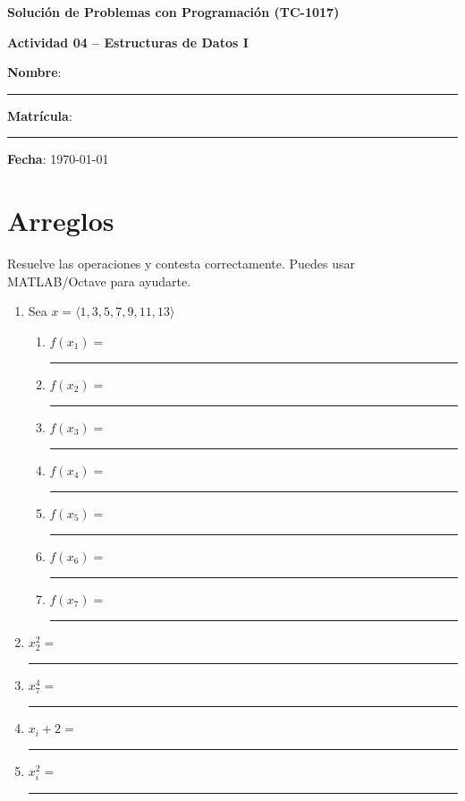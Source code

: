 \documentclass[spanish, 10pt]{article}
\newcommand{\shortresponserule}{{\large\rule{5 cm}{0.3mm}}}
\begin{document}
\begin{center}
	{\Large \textbf{Solución de Problemas con Programación (TC-1017)}}
	
	\bigskip
	{\large \textbf{Actividad 04 -- Estructuras de Datos I}}
\end{center}

\bigskip
{\large \textbf{Nombre}: \rule{13.7 cm}{0.4mm}}



\bigskip
{\large \textbf{Matrícula}: \rule{5 cm}{0.4mm}} \hfill {\large \textbf{Fecha}: \today}

\bigskip


\section{Arreglos}

Resuelve las operaciones y contesta correctamente. Puedes usar MATLAB/Octave para ayudarte.

\begin{enumerate}
    \itemsep2.5ex
    \item Sea $x = \langle 1, 3, 5, 7, 9, 11, 13 \rangle$
        \bigskip
    \begin{enumerate}
        \item $f(x_1) =$ \quad \; \shortresponserule
        \item $f(x_2) =$ \quad \; \shortresponserule
        \item $f(x_3) =$ \quad \; \shortresponserule
        \item $f(x_4) =$ \quad \; \shortresponserule
        \item $f(x_5) =$ \quad \; \shortresponserule
        \item $f(x_6) =$ \quad \; \shortresponserule
        \item $f(x_7) =$ \quad \; \shortresponserule
    \end{enumerate}
    \item $x_2^2 =$ \hfill \shortresponserule
    \item $x_7^4 =$ \hfill \shortresponserule
    \item $x_i+2 =$  \hfill \shortresponserule
    \item $x_i^2 =$  \hfill \shortresponserule
\end{enumerate}
\end{document}
